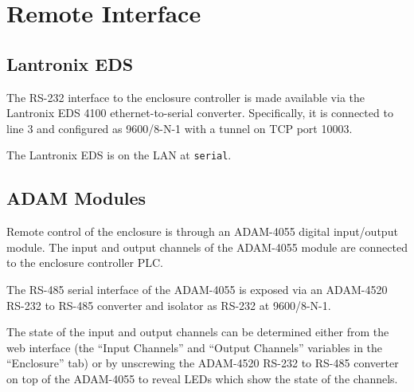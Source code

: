 \section{Remote Interface}

\subsection{Lantronix EDS}
\label{section:enclosure-lantronix-eds}

The RS-232 interface to the enclosure controller is made available via the Lantronix EDS 4100 ethernet-to-serial converter. Specifically, it is connected to line 3 and configured as 9600/8-N-1 with a tunnel on TCP port 10003.

The Lantronix EDS is on the LAN at \verb|serial|.

\subsection{ADAM Modules}
\label{section:enclosure-adam-modules}

Remote control of the enclosure is through an ADAM-4055 digital input/output module. The input and output channels of the ADAM-4055 module are connected to the enclosure controller PLC.

The RS-485 serial interface of the ADAM-4055 is exposed via an ADAM-4520 RS-232 to RS-485 converter and isolator as RS-232 at 9600/8-N-1.

The state of the input and output channels can be determined either from the web interface (the “Input Channels” and “Output Channels” variables in the “Enclosure” tab) or by unscrewing the ADAM-4520 RS-232 to RS-485 converter on top of the ADAM-4055 to reveal LEDs which show the state of the channels.


